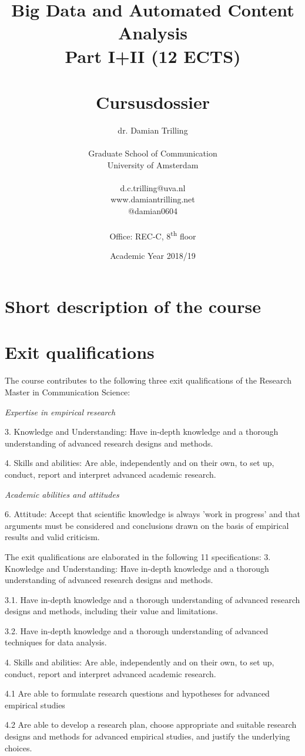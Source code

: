 \documentclass[a4paper,12pt]{report}
\title{Big Data and Automated Content Analysis\\ Part I+II (12 ECTS)\\~\\Cursusdossier}
\author{dr. Damian Trilling\\~\\Graduate School of Communication\\University of Amsterdam\\~\\d.c.trilling@uva.nl\\www.damiantrilling.net\\@damian0604\\~\\Office: REC-C, 8\textsuperscript{th} floor}
\date{Academic Year 2018/19}
\begin{document}
\maketitle

\tableofcontents


\chapter{Short description of the course}



\chapter{Exit qualifications}

The course contributes to the following three exit qualifications of the Research Master in Communication Science: 


\textit{Expertise in empirical research}


	3.	Knowledge and Understanding: Have in-depth knowledge and a thorough understanding of advanced research designs and methods.


	4.	Skills and abilities: Are able, independently and on their own, to set up, conduct, report and interpret advanced academic research.


\textit{Academic abilities and attitudes}


	6.	Attitude: Accept that scientific knowledge is always 'work in progress' and that arguments must be considered and conclusions drawn on the basis of empirical results and valid criticism.


The exit qualifications are elaborated in the following 11 specifications:
3. Knowledge and Understanding: Have in-depth knowledge and a thorough understanding of advanced research designs and methods. 


3.1. Have in-depth knowledge and a thorough understanding of advanced research designs and methods, including their value and limitations.


3.2.	Have in-depth knowledge and a thorough understanding of advanced techniques for data analysis.


4. Skills and abilities: Are able, independently and on their own, to set up, conduct, report and interpret advanced academic research.


4.1	Are able to formulate research questions and hypotheses for advanced empirical studies


4.2	Are able to develop a research plan, choose appropriate and suitable research designs and methods for advanced empirical studies, and justify the underlying choices. 
\end{document}
